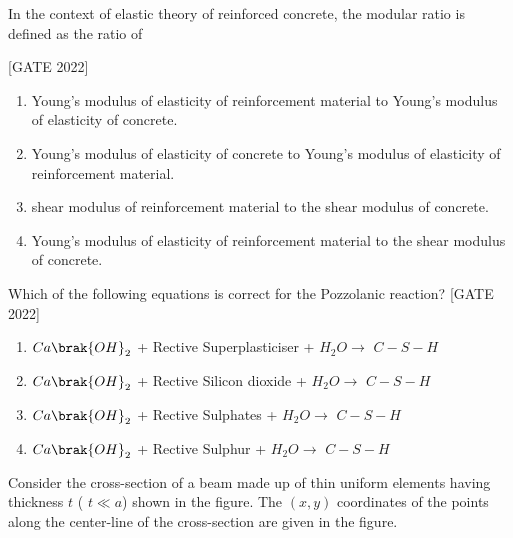 \iffalse
\title{2022-CE}
\author{EE24BTECH11020 -  Ellanti Rohith}
\section{ce}
\chapter{2022}
\fi
\item In the context of elastic theory of reinforced concrete, the modular ratio is defined as the ratio of\par \hfill{[GATE 2022]}
\begin{enumerate}

\item Young's modulus of elasticity of reinforcement material to Young's modulus of elasticity of concrete.\vspace{4pt} 
\item Young's modulus of elasticity of concrete to Young's modulus of elasticity of reinforcement material.\vspace{4pt}
\item shear modulus of reinforcement material to the shear modulus of concrete.\vspace{4pt}
\item Young's modulus of elasticity of reinforcement material to the shear modulus of concrete.\vspace{4pt}

\end{enumerate}
\item Which of the following equations is correct for the Pozzolanic reaction?\vspace{4pt}
\hfill{[GATE 2022]}\begin{enumerate}
\item $Ca\brak{OH}_{2}$ + Rective Superplasticiser + $H_{2}O \rightarrow$ $C-S-H$\vspace{4pt}
\item $Ca\brak{OH}_{2}$ + Rective Silicon dioxide + $H_{2}O \rightarrow$ $C-S-H$\vspace{4pt}
\item $Ca\brak{OH}_{2}$ + Rective Sulphates + $H_{2}O \rightarrow$ $C-S-H$\vspace{4pt}
\item $Ca\brak{OH}_{2}$ + Rective Sulphur + $H_{2}O \rightarrow$ $C-S-H$
\end{enumerate}
\item Consider the cross-section of a beam made up of thin uniform elements having thickness  $ t  $ ( $ t \ll a  $) shown in the figure. The  $(x, y) $ coordinates of the points along the center-line of the cross-section are given in the figure.

